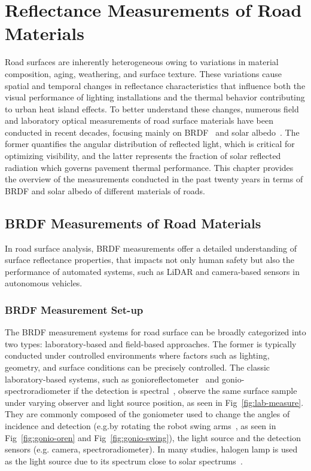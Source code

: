\chapter{Reflectance Measurements of Road Materials}

Road surfaces are inherently heterogeneous owing to variations in material composition, aging, weathering, and surface texture.
These variations cause spatial and temporal changes in reflectance characteristics that influence both the visual performance of lighting installations and the thermal behavior contributing to urban heat island effects.
To better understand these changes, numerous field and laboratory optical measurements of road surface materials have been conducted in recent decades, focusing mainly on BRDF~\cite{1995_Oren,2000_Meister,2010_Roser,2023_Spieringhs} and solar albedo~\cite{1988_Blumthaler,2011_KUSHARI,2019_Chen,2022_Bai}.
The former quantifies the angular distribution of reflected light, which is critical for optimizing visibility, and the latter represents the fraction of solar reflected radiation which governs pavement thermal performance.
This chapter provides the overview of the measurements conducted in the past twenty years in terms of BRDF and solar albedo of different materials of roads.

\section{BRDF Measurements of Road Materials}

In road surface analysis, BRDF measurements offer a detailed understanding of surface reflectance properties, that impacts not only human safety but also the performance of automated systems, such as LiDAR and camera-based sensors in autonomous vehicles.


\subsection{BRDF Measurement Set-up}

The BRDF measurement systems for road surface can be broadly categorized into two types: laboratory-based and field-based approaches.
The former is typically conducted under controlled environments where factors such as lighting, geometry, and surface conditions can be precisely controlled.
The classic laboratory-based systems, such as gonioreflectometer~\cite{1995_Oren,2022_Hebert,2023_Spieringhs} and gonio-spectroradiometer if the detection is spectral~\cite{2000_Meister,2022_Wise, 2023_Zhuang}, observe the same surface sample under varying observer and light source position, as seen in Fig~\ref{fig:lab-measure}.
They are commonly composed of the goniometer used to change the angles of incidence and detection (e.g.by rotating the robot swing arms~\cite{1995_Oren,2022_Hebert,2022_Wise}, as seen in Fig~\ref{fig:gonio-oren} and Fig~\ref{fig:gonio-swing}), the light source and the detection sensors (e.g. camera, spectroradiometer).
In many studies, halogen lamp is used as the light source due to its spectrum close to solar spectrums~\cite{2000_Meister,2022_Hebert, 2023_Spieringhs,2022_Wise,2023_Zhuang}.


